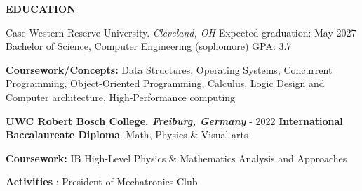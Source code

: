 \begin{rSection}{\small \normalfont \textbf{EDUCATION}}    

    \begin{rSubsection}
        {Case Western Reserve University. {\slshape Cleveland, OH} }
        {\ttfamily Expected graduation: May 2027}
        {Bachelor of Science, Computer Engineering (sophomore)}
        {GPA: 3.7}
        \item{\textbf{Coursework/Concepts:} Data Structures, Operating Systems, Concurrent Programming, Object-Oriented Programming, Calculus, Logic Design and Computer architecture, High-Performance computing}

        
    \end{rSubsection}
    

    \begin{rSubsection}
        {\bfseries UWC Robert Bosch College. {\slshape Freiburg, Germany}}
        { - 2022}
        {\textbf{International Baccalaureate Diploma}.  Math, Physics \& Visual arts}
        {}
        \item{ \textbf{Coursework:} IB High-Level Physics \& Mathematics Analysis and Approaches}
        \item {\textbf{Activities} : President of Mechatronics Club}
    \end{rSubsection} 
           
    
\end{rSection}